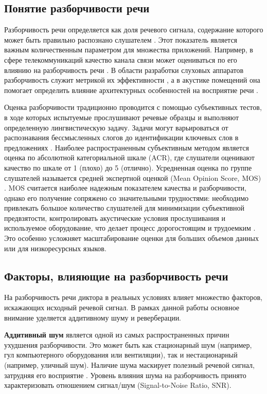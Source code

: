 \documentclass[oneside, final, 14pt]{extarticle}
\begin{document}
\subsection{Понятие разборчивости речи}

Разборчивость речи определяется как доля речевого сигнала, содержание которого может быть правильно распознано слушателем \cite{Sharma2016}. Этот показатель является важным количественным параметром для множества приложений. Например, в сфере телекоммуникаций качество канала связи может оцениваться по его влиянию на разборчивость речи \cite{Steeneken1980}. В области разработки слуховых аппаратов разборчивость служит метрикой их эффективности \cite{vanHoesel2003}, а в акустике помещений она помогает определить влияние архитектурных особенностей на восприятие речи \cite{Houtgast1985}.

Оценка разборчивости традиционно проводится с помощью субъективных тестов, в ходе которых испытуемые прослушивают речевые образцы и выполняют определенную лингвистическую задачу. Задачи могут варьироваться от распознавания бессмысленных слогов \cite{Miller1955} до идентификации ключевых слов в предложениях \cite{Kalikow1977}. Наиболее распространенным субъективным методом является оценка по абсолютной категориальной шкале (ACR), где слушатели оценивают качество по шкале от 1 (плохо) до 5 (отлично). Усредненная оценка по группе слушателей называется средней экспертной оценкой (Mean Opinion Score, MOS) \cite{Zha2003}. MOS считается наиболее надежным показателем качества и разборчивости, однако его получение сопряжено со значительными трудностями: необходимо привлекать большое количество слушателей для минимизации субъективной предвзятости, контролировать акустические условия прослушивания и используемое оборудование, что делает процесс дорогостоящим и трудоемким \cite{Agrawal2025}. Это особенно усложняет масштабирование оценки для больших объемов данных или для низкоресурсных языков.

\subsection{Факторы, влияющие на разборчивость речи}

На разборчивость речи диктора в реальных условиях влияет множество факторов, искажающих исходный речевой сигнал. В рамках данной работы основное внимание уделяется аддитивному шуму и реверберации.

\textbf{Аддитивный шум} является одной из самых распространенных причин ухудшения разборчивости. Это может быть как стационарный шум (например, гул компьютерного оборудования или вентиляции), так и нестационарный (например, уличный шум). Наличие шума маскирует полезный речевой сигнал, затрудняя его восприятие \cite{Sharma2016}. Уровень влияния шума на разборчивость принято характеризовать отношением сигнал/шум (Signal-to-Noise Ratio, SNR).
\end{document}
